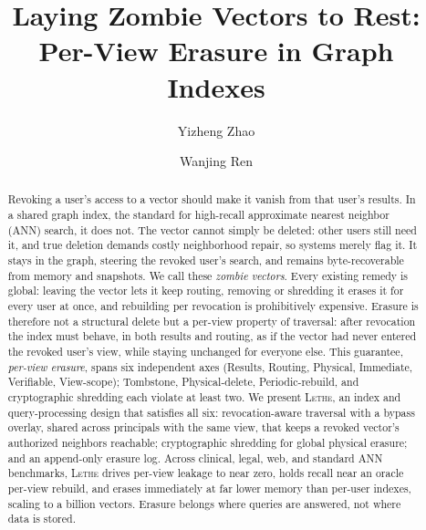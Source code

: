 \documentclass[sigconf, nonacm, review]{acmart}
\begin{document}
\title[Zombie Vectors]{Laying Zombie Vectors to Rest:\\Per-View Erasure in Graph Indexes}
\author{Yizheng Zhao}
\author{Wanjing Ren}

\begin{abstract}
Revoking a user's access to a vector should make it vanish from that user's
results. In a shared graph index, the standard for high-recall approximate
nearest neighbor (ANN) search, it does not. The vector cannot simply be
deleted: other users still need it, and true deletion demands costly
neighborhood repair, so systems merely flag it. It stays in the graph,
steering the revoked user's search, and remains byte-recoverable from memory
and snapshots. We call these \emph{zombie vectors}. Every existing remedy is global: leaving the vector lets it keep routing, removing or shredding it erases it for every user at once, and rebuilding per revocation is prohibitively expensive. Erasure is therefore not a structural delete but a per-view property of traversal: after revocation the
index must behave, in both results and routing, as if the vector had never
entered the revoked user's view, while staying unchanged for everyone else.
This guarantee, \emph{per-view erasure}, spans six independent axes
(Results, Routing, Physical, Immediate, Verifiable, View-scope); Tombstone,
Physical-delete, Periodic-rebuild, and cryptographic shredding each violate
at least two. We present \textsc{Lethe}, an index and query-processing design
that satisfies all six: revocation-aware traversal with a bypass overlay,
shared across principals with the same view, that keeps a revoked vector's authorized neighbors
reachable; cryptographic shredding for global physical
erasure; and an append-only erasure log. Across clinical, legal, web, and
standard ANN benchmarks, \textsc{Lethe} drives per-view leakage to near zero,
holds recall near an oracle per-view rebuild, and
erases immediately at far lower memory than per-user indexes, scaling to a
billion vectors. Erasure belongs where queries are answered, not where data is
stored.
\end{abstract}

\maketitle
\end{document}
